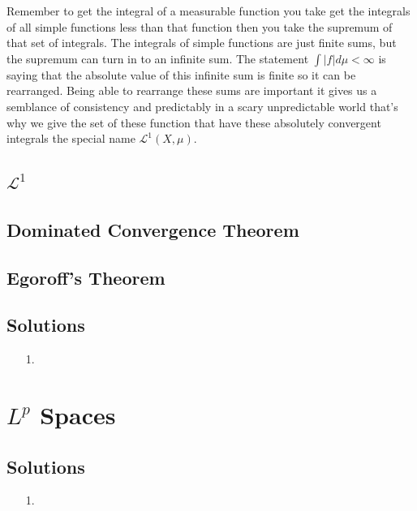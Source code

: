 \documentclass[oneside]{book}
\begin{document}
Remember to get the integral of a measurable function you take get the integrals of all simple functions less than that function then you take the supremum of that set of integrals. The integrals of simple functions are just finite sums, but the supremum can turn in to an infinite sum. The statement $\int |f| d\mu < \infty$ is saying that the absolute value of this infinite sum is finite so it can be rearranged. Being able to rearrange these sums are important it gives us a semblance of consistency and predictably in a scary unpredictable world that's why we give the set of these function that have these absolutely convergent integrals the special name $\mathcal{L}^1(X,\mu)$. 

\section{$\mathcal{L}^1$}


\section{Dominated Convergence Theorem}

\section{Egoroff's Theorem}

\section*{Solutions}
\begin{enumerate}
\item[1.] 

\end{enumerate}

\chapter{$L^p$ Spaces}

\section*{Solutions}
\begin{enumerate}
\item[1.]

\end{enumerate}
\end{document}

